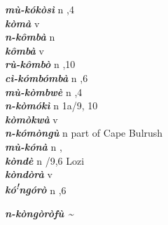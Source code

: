 \begin{multicols}{2}
{{\bfseries\itshape mù-kókòsì}} \relax  n  ,4  \relax   \relax  \\
{{\bfseries\itshape kòmà}} \relax  v  \relax   \relax  {} \relax   \relax  \\
{{\bfseries\itshape n-kômbà}} \relax  n   \relax  {} \relax   \relax  \\
{{\bfseries\itshape kômbà}} \relax  v  \relax   \relax  {} \relax   \relax  \\
{{\bfseries\itshape rù-kômbò}} \relax  n  ,10  \relax   \relax  \\
{{\bfseries\itshape cì-kómbómbà}} \relax  n  ,6  \relax   \relax  \\
{{\bfseries\itshape mù-kòmbwè}} \relax  n  ,4  \relax   \relax  \\
{{\bfseries\itshape n-kòmókì}} \relax  n  \relax  1a/9, 10  \relax   \relax  \\
{{\bfseries\itshape kòmòkwà}} \relax  v  \relax   \relax  {} \relax   \relax  \\
{{\bfseries\itshape n-kómòngù}} \relax  n \relax  part of Cape Bulrush   \relax   \relax  \\
{{\bfseries\itshape mù-kónà}} \relax  n  , \relax  {} \relax   \relax  \\
{{\bfseries\itshape kòndè}} \relax  n  /9,6  \relax  Lozi \relax  \\
{{\bfseries\itshape kòndòrà}} \relax  v  \relax   \relax  {} \relax   \relax  \\
{{\bfseries\itshape kó\textsuperscript{!}ngórò}} \relax  n  ,6  \relax   \relax  \\
{{\bfseries\itshape n-kòngòròfù {\textasciitilde}}

}
\end{multicols}
